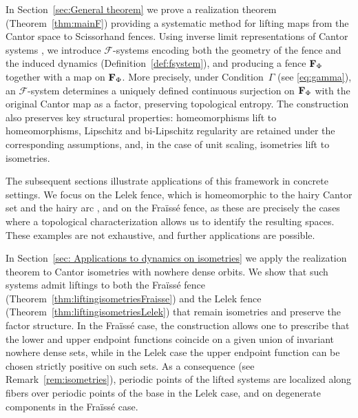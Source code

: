 \documentclass[11pt]{amsart}
\newcommand{\fence}{{\bf F}_{\Phi}{}}
\newcommand{\cF}{\mathcal{F}}
\begin{document}
In Section~\ref{sec:General theorem} we prove a realization theorem (Theorem~\ref{thm:mainF}) providing a systematic method for lifting maps from the Cantor space to Scissorhand fences. Using inverse limit representations of Cantor systems \cite{AkinGlasnerWeiss,DarjiBernardes,shimomuraGraphCover}, we introduce $\cF$-systems encoding both the geometry of the fence and the induced dynamics (Definition~\ref{def:fsystem}), and producing a fence $\fence$ together with a map on $\fence$. 
More precisely, under Condition~$\Gamma$ (see \eqref{eq:gamma}), an $\cF$-system determines a uniquely defined continuous surjection on $\fence$ with the original Cantor map as a factor, preserving topological entropy. The construction also preserves key structural properties: homeomorphisms lift to homeomorphisms, Lipschitz and bi-Lipschitz regularity are retained under the corresponding assumptions, and, in the case of unit scaling, isometries lift to isometries.

The subsequent sections illustrate applications of this framework in concrete settings. We focus on the Lelek fence, which is homeomorphic to the hairy Cantor set \cite{haircantorset} and the hairy arc \cite{AO93}, and on the Fra\"iss\'e fence, as these are precisely the cases where a topological characterization allows us to identify the resulting spaces. These examples are not exhaustive, and further applications are possible.

In Section~\ref{sec: Applications to dynamics on isometries} we apply the realization theorem to Cantor isometries with nowhere dense orbits. We show that such systems admit liftings to both the Fra\"iss\'e fence (Theorem~\ref{thm:liftingisometriesFraisse}) and the Lelek fence (Theorem~\ref{thm:liftingisometriesLelek}) that remain isometries and preserve the factor structure. In the Fra\"iss\'e case, the construction allows one to prescribe that the lower and upper endpoint functions coincide on a given union of invariant nowhere dense sets, while in the Lelek case the upper endpoint function can be chosen strictly positive on such sets. 
As a consequence (see Remark~\ref{rem:isometries}), periodic points of the lifted systems are localized along fibers over periodic points of the base in the Lelek case, and on degenerate components in the Fra\"iss\'e case.
\end{document}
